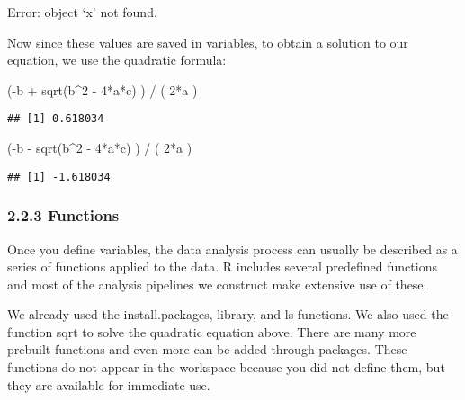 \documentclass[
]{article}
\newenvironment{Shaded}{\begin{snugshade}}{\end{snugshade}}
\newcommand{\DecValTok}[1]{\textcolor[rgb]{0.00,0.00,0.81}{#1}}
\newcommand{\FunctionTok}[1]{\textcolor[rgb]{0.00,0.00,0.00}{#1}}
\newcommand{\NormalTok}[1]{#1}
\newcommand{\SpecialCharTok}[1]{\textcolor[rgb]{0.00,0.00,0.00}{#1}}
\begin{document}
Error: object `x' not found.

Now since these values are saved in variables, to obtain a solution to
our equation, we use the quadratic formula:

\begin{Shaded}
\begin{Highlighting}[]
\NormalTok{(}\SpecialCharTok{{-}}\NormalTok{b }\SpecialCharTok{+} \FunctionTok{sqrt}\NormalTok{(b}\SpecialCharTok{\^{}}\DecValTok{2} \SpecialCharTok{{-}} \DecValTok{4}\SpecialCharTok{*}\NormalTok{a}\SpecialCharTok{*}\NormalTok{c) ) }\SpecialCharTok{/}\NormalTok{ ( }\DecValTok{2}\SpecialCharTok{*}\NormalTok{a )}
\end{Highlighting}
\end{Shaded}

\begin{verbatim}
## [1] 0.618034
\end{verbatim}

\begin{Shaded}
\begin{Highlighting}[]
\NormalTok{(}\SpecialCharTok{{-}}\NormalTok{b }\SpecialCharTok{{-}} \FunctionTok{sqrt}\NormalTok{(b}\SpecialCharTok{\^{}}\DecValTok{2} \SpecialCharTok{{-}} \DecValTok{4}\SpecialCharTok{*}\NormalTok{a}\SpecialCharTok{*}\NormalTok{c) ) }\SpecialCharTok{/}\NormalTok{ ( }\DecValTok{2}\SpecialCharTok{*}\NormalTok{a )}
\end{Highlighting}
\end{Shaded}

\begin{verbatim}
## [1] -1.618034
\end{verbatim}

\hypertarget{functions}{%
\subsubsection{2.2.3 Functions}\label{functions}}

Once you define variables, the data analysis process can usually be
described as a series of functions applied to the data. R includes
several predefined functions and most of the analysis pipelines we
construct make extensive use of these.

We already used the install.packages, library, and ls functions. We also
used the function sqrt to solve the quadratic equation above. There are
many more prebuilt functions and even more can be added through
packages. These functions do not appear in the workspace because you did
not define them, but they are available for immediate use.
\end{document}
